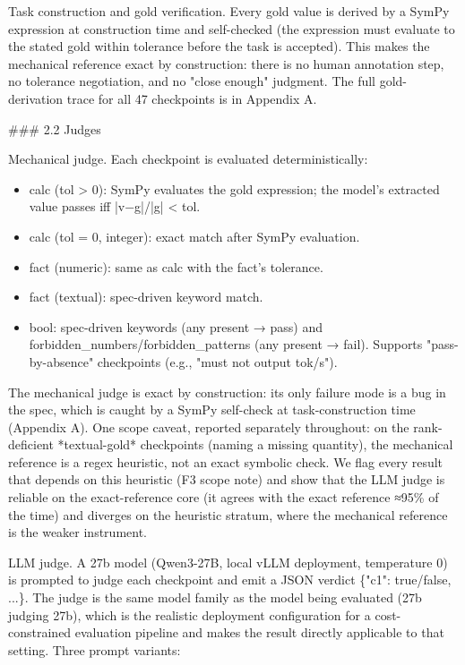 \documentclass[10pt,twocolumn]{article}
\begin{document}
Task construction and gold verification. Every gold value is derived by a SymPy expression at construction time and self-checked (the expression must evaluate to the stated gold within tolerance before the task is accepted). This makes the mechanical reference exact by construction: there is no human annotation step, no tolerance negotiation, and no "close enough" judgment. The full gold-derivation trace for all 47 checkpoints is in Appendix A.


\#\#\# 2.2 Judges


Mechanical judge. Each checkpoint is evaluated deterministically:


\begin{itemize}
  \item calc (tol > 0): SymPy evaluates the gold expression; the model's extracted value passes iff |v−g|/|g| < tol.
  \item calc (tol = 0, integer): exact match after SymPy evaluation.
  \item fact (numeric): same as calc with the fact's tolerance.
  \item fact (textual): spec-driven keyword match.
  \item bool: spec-driven keywords (any present → pass) and forbidden\_numbers/forbidden\_patterns (any present → fail). Supports "pass-by-absence" checkpoints (e.g., "must not output tok/s").
\end{itemize}


The mechanical judge is exact by construction: its only failure mode is a bug in the spec, which is caught by a SymPy self-check at task-construction time (Appendix A). One scope caveat, reported separately throughout: on the rank-deficient *textual-gold* checkpoints (naming a missing quantity), the mechanical reference is a regex heuristic, not an exact symbolic check. We flag every result that depends on this heuristic (F3 scope note) and show that the LLM judge is reliable on the exact-reference core (it agrees with the exact reference ≈95\% of the time) and diverges on the heuristic stratum, where the mechanical reference is the weaker instrument.


LLM judge. A 27b model (Qwen3-27B, local vLLM deployment, temperature 0) is prompted to judge each checkpoint and emit a JSON verdict \{"c1": true/false, ...\}. The judge is the same model family as the model being evaluated (27b judging 27b), which is the realistic deployment configuration for a cost-constrained evaluation pipeline and makes the result directly applicable to that setting. Three prompt variants:
\end{document}
